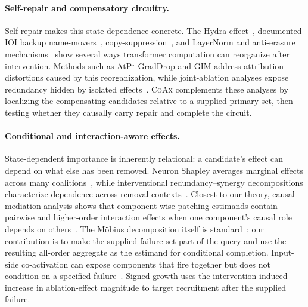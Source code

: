\documentclass{article} %
\theoremstyle{plain}
\theoremstyle{definition}
\newcommand{\coax}{\textsc{CoAx}\xspace}
\begin{document}
\paragraph{Self-repair and compensatory circuitry.}
Self-repair makes this state dependence concrete.
The Hydra effect~\citep{mcgrath2023hydra}, documented IOI backup name-movers~\citep{wang2022ioi}, copy-suppression~\citep{mcdougall2023copysuppression}, and LayerNorm and anti-erasure mechanisms~\citep{rushing2024selfrepair} show several ways transformer computation can reorganize after intervention.
Methods such as AtP$^\star$ GradDrop and GIM address attribution distortions caused by this reorganization, while joint-ablation analyses expose redundancy hidden by isolated effects~\citep{kramar2024atp,edin2025gim,ye2026hiddenheroes}.
\coax complements these analyses by localizing the compensating candidates relative to a supplied primary set, then testing whether they causally carry repair and complete the circuit.

\paragraph{Conditional and interaction-aware effects.}
State-dependent importance is inherently relational: a candidate's effect can depend on what else has been removed.
Neuron Shapley averages marginal effects across many coalitions~\citep{ghorbani2020neuronshapley}, while interventional redundancy--synergy decompositions characterize dependence across removal contexts~\citep{aghilar2026scalarlimit}.
Closest to our theory, causal-mediation analysis shows that component-wise patching estimands contain pairwise and higher-order interaction effects when one component's causal role depends on others~\citep{mediators2026curse}.
The M\"obius decomposition itself is standard~\citep{rota1964foundations}; our contribution is to make the supplied failure set part of the query and use the resulting all-order aggregate as the estimand for conditional completion.
Input-side co-activation can expose components that fire together but does not condition on a specified failure~\citep{closure2026}.
Signed growth uses the intervention-induced increase in ablation-effect magnitude to target recruitment after the supplied failure.

\end{document}
